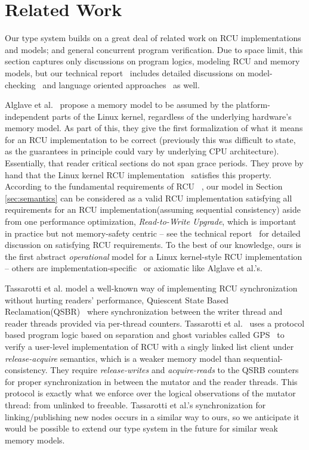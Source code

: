 \section{Related Work}
\label{sec:relatedwork}
Our type system builds on a great deal of related work on RCU implementations and models; and general concurrent program verification. Due to space limit, this section captures only discussions on program logics, modeling RCU and memory models, but our technical report~\cite{isotek} includes detailed discussions on model-checking~\cite{Kokologiannakis:2017:SMC:3092282.3092287,LiangMKM16,urcu_ieee} and language oriented approaches~\cite{Howard:2011:RES:2001252.2001267,Cooper2015RelativisticPI,Howard:2011:RES:2001252.2001267} as well.

Alglave et al.~\cite{Alglave:2018:FSC:3173162.3177156} propose a memory model to be assumed by the platform-independent parts of the Linux kernel, regardless of the underlying hardware's memory model.
As part of this, they give the first formalization of what it means for an RCU implementation to be correct (previously this was difficult to state, as the guarantees in principle could vary by underlying CPU architecture). Essentially, that reader critical sections do not span grace periods. They prove by hand that the Linux kernel RCU implementation~\cite{DBLP:conf/cav/AlglaveKT13} satisfies this property. According to the fundamental requirements of \textsf{RCU} ~\cite{abssem}, our model in Section \ref{sec:semantics} can be considered as a valid RCU implementation satisfying all requirements for an RCU implementation(assuming sequential consistency) aside from one performance optimization, \textit{Read-to-Write Upgrade}, which is important in practice but not memory-safety centric -- see the technical report~\cite{isotek} for detailed discussion on satisfying RCU requirements. To the best of our knowledge, ours is the first abstract \emph{operational} model for a Linux kernel-style RCU implementation -- others are implementation-specific~\cite{Mandrykin:2016:TDV:3001219.3001297} or axiomatic like Alglave et al.'s.

Tassarotti et al. model a well-known way of implementing RCU synchronization without hurting readers' performance, \textsf{Quiescent State Based Reclamation}(QSBR)~\cite{urcu_ieee} where synchronization between the writer thread and reader threads provided via per-thread counters. Tassarotti et al.~\cite{verrcu} uses a protocol based program logic based on separation and ghost variables called \textsf{GPS}~\cite{Turon:2014:GNW:2660193.2660243} to verify a user-level implementation of \textsf{RCU} with a singly linked list client under \emph{release-acquire} semantics, which is a weaker memory model than sequential-consistency. They require \textit{release-writes} and \textit{acquire-reads} to the QSRB counters for proper synchronization in between the mutator and the reader threads. This protocol is exactly what we enforce over the logical observations of the mutator thread: from \textsf{unlinked} to \textsf{freeable}. 
Tassarotti et al.'s synchronization for linking/publishing new nodes occurs in a similar way to ours, so we anticipate it would be possible to extend our type system in the future for similar weak memory models.

